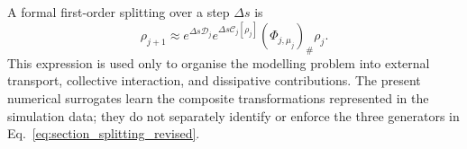 A formal first-order splitting over a step $\Delta s$ is
\begin{equation}
    \rho_{j+1}
    \approx
    e^{\Delta s\mathcal{D}_j}
    e^{\Delta s\mathcal{C}_j[\rho_j]}
    (\Phi_{j,\mu_j})_{\#}\rho_j.
    \label{eq:section_splitting_revised}
\end{equation}
This expression is used only to organise the modelling problem into external transport, collective interaction, and dissipative contributions. The present numerical surrogates learn the composite transformations represented in the simulation data; they do not separately identify or enforce the three generators in Eq.~\eqref{eq:section_splitting_revised}.


